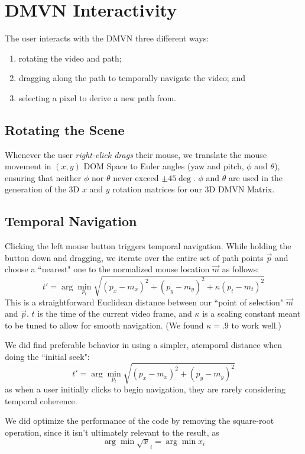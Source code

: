 \section{DMVN Interactivity}
The user interacts with the DMVN three different ways:
\begin{enumerate}
\item rotating the video and path;
\item dragging along the path to temporally navigate the video; and
\item selecting a pixel to derive a new path from.
\end{enumerate}

\subsection{Rotating the Scene}
Whenever the user \emph{right-click drags} their mouse, we translate the mouse movement in $(x,y)$ DOM Space to Euler angles (yaw and pitch, $\phi$ and $\theta$), ensuring that neither $\phi$ nor $\theta$ never exceed $\pm45\deg$. $\phi$ and $\theta$ are used in the generation of the 3D $x$ and $y$ rotation matrices for our 3D DMVN Matrix.

\subsection{Temporal Navigation}
Clicking the left mouse button triggers temporal navigation. While holding the button down and dragging, we iterate over the entire set of path points $\vec{p}$ and choose a ``nearest" one to the normalized mouse location $\vec{m}$ as follows:
\begin{equation}
    t'= \arg \min_{p_t} \sqrt{(p_x-m_x)^2 + (p_y-m_y)^2 + \kappa (p_t - m_t)^2}
\end{equation}
This is a straightforward Euclidean distance between our ``point of selection" $\vec{m}$ and $\vec{p}$. $t$ is the time of the current video frame, and $\kappa$ is a scaling constant meant to be tuned to allow for smooth navigation. (We found $\kappa=.9$ to work well.)
\par We did find preferable behavior in using a simpler, atemporal distance when doing the ``initial seek":
\begin{equation}
    t'= \arg \min_{p_t} \sqrt{(p_x-m_x)^2 + (p_y-m_y)^2}
\end{equation}
as when a user initially clicks to begin navigation, they are rarely considering temporal coherence.
\par We did optimize the performance of the code by removing the square-root operation, since it isn't ultimately relevant to the result, as
\begin{equation}
    \arg \min \sqrt x_i = \arg \min x_i
\end{equation}


